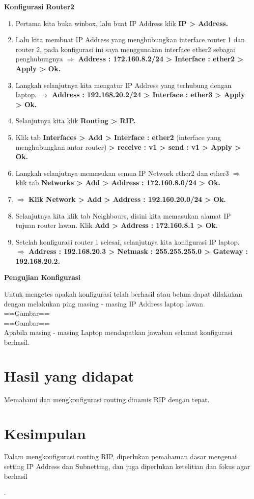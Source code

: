 \begin{center}
	\textbf{Konfigurasi Router2}
\end{center}
\begin{enumerate}
	\item Pertama kita buka winbox, lalu buat IP Address klik \textbf{IP > Address.}
	\item Lalu kita membuat IP Address yang menghubungkan interface router 1 dan router 2, pada konfigurasi ini saya menggunakan interface ether2 sebagai penghubungnya $\Rightarrow$ \textbf{Address : 172.160.8.2/24 > Interface : ether2 > Apply > Ok.}
	\item Langkah selanjutnya kita mengatur IP Address yang terhubung dengan laptop. $\Rightarrow$ \textbf{Address : 192.168.20.2/24 > Interface : ether3 > Apply > Ok.}
	\item Selanjutnya kita klik \textbf{Routing > RIP.}
	\item Klik tab \textbf{Interfaces > Add > Interface : ether2} (interface yang menghubungkan antar router) \textbf{> receive : v1 > send : v1 > Apply > Ok.}
	\item Langkah selanjutnya memasukan semua IP Network ether2 dan ether3 $\Rightarrow$ klik tab \textbf{Networks > Add > Address : 172.160.8.0/24 > Ok.}
	\item $\Rightarrow$ \textbf{Klik Network > Add > Address : 192.160.20.0/24 > Ok.}
	\item Selanjutnya kita klik tab Neighbours, disini kita memasukan alamat IP tujuan router lawan. Klik \textbf{Add > Address : 172.160.8.1 > Ok.}
	\item Setelah konfigurasi router 1 selesai, selanjutnya kita konfigurasi IP laptop. $\Rightarrow$ \textbf{Address : 192.168.20.3 > Netmask : 255.255.255.0 > Gateway : 192.168.20.2.}
\end{enumerate}

\begin{center}
	\textbf{Pengujian Konfigurasi}
\end{center}
Untuk mengetes apakah konfigurasi telah berhasil atau belum dapat dilakukan dengan melakukan ping masing - masing IP Address laptop lawan.\\
==Gambar==\\==Gambar==\\
Apabila masing - masing Laptop mendapatkan jawaban selamat konfigurasi berhasil.

\section{Hasil yang didapat}
Memahami dan mengkonfigurasi routing dinamis RIP dengan tepat.

\section{Kesimpulan}
Dalam mengkonfigurasi routing RIP, diperlukan pemahaman dasar mengenai setting IP Address dan Subnetting, dan juga diperlukan ketelitian dan fokus agar berhasil

\cite{Newton1687}.

